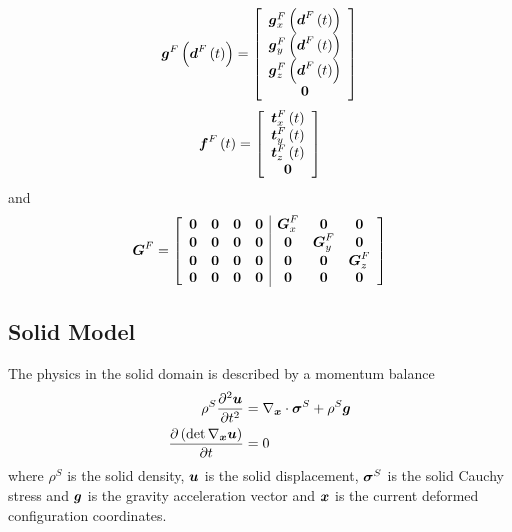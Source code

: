 \begin{equation}
   \boldsymbol{g}^{F}\left(  \boldsymbol{d}^{F}\left( t \right)  \right) =\left[\begin{array}{c}
   \boldsymbol{g}^{F}_{x}\left(  \boldsymbol{d}^{F}\left( t \right)  \right)  \\
   \boldsymbol{g}^{F}_{y}\left(  \boldsymbol{d}^{F}\left( t \right)  \right)  \\
   \boldsymbol{g}^{F}_{z}\left(  \boldsymbol{d}^{F}\left( t \right)  \right)  \\
  \boldsymbol{0}
  \end{array}\right]
\end{equation}
\begin{equation}
   \boldsymbol{f}^{F}\left( t \right) =\left[\begin{array}{c}
   \boldsymbol{t}^{F}_{x}\left( t \right)  \\
   \boldsymbol{t}^{F}_{y}\left( t \right)  \\
   \boldsymbol{t}^{F}_{z}\left( t \right)  \\
  \boldsymbol{0}
  \end{array}\right]
\end{equation}
and
\begin{equation}
  \matr{G}^{F}=\left[\begin{array}{cccc|ccc}
    \matr{0} & \matr{0} & \matr{0} & \matr{0} & \matr{G}^{F}_{x} & \matr{0} & \matr{0} \\
    \matr{0} & \matr{0} & \matr{0} & \matr{0} & \matr{0} & \matr{G}^{F}_{y} & \matr{0} \\
    \matr{0} & \matr{0} & \matr{0} & \matr{0} & \matr{0} & \matr{0} & \matr{G}^{F}_{z} \\
    \matr{0} & \matr{0} & \matr{0} & \matr{0} & \matr{0} & \matr{0} & \matr{0}
  \end{array}\right]
\end{equation}

\subsection{Solid Model}

The physics in the solid domain is described by a momentum balance
\begin{align}
  \rho^{S}\deltwosqby{\vectr{u}}{t}&=\divergence{\vectr{x}}{\tensor{\sigma}^{S}}+\rho^{S}\vectr{g}
  \label{eqn:FSIElasticMomentum} \\
  \delby{\pbrac{\determinant{\gradient{\vectr{x}}{\vectr{u}}}}}{t}&=0 \label{eqn:FSIElasticContinuity}
\end{align}
where $\rho^{S}$ is the solid density, $\boldsymbol{u}$ is the solid displacement,
$\boldsymbol{\mathit{\sigma}}^{S}$ is the solid Cauchy stress and $\boldsymbol{g}$ is the gravity
acceleration vector and $\boldsymbol{x}$ is the current deformed configuration coordinates.

